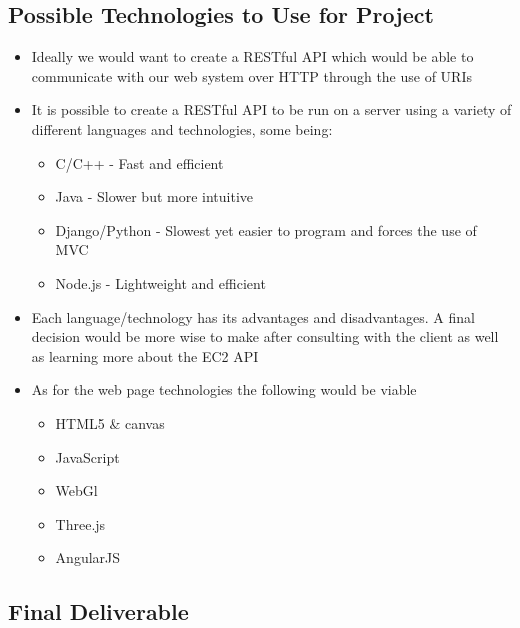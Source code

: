 \documentclass{article}
\begin{document}
	\subsection{Possible Technologies to Use for Project}
		\begin{itemize}
			\item Ideally we would want to create a RESTful API which would be able to communicate with our web system over HTTP through the use of URIs
			\item It is possible to create a RESTful API to be run on a server using a variety of different languages and technologies, some being:
			\begin{itemize}
				\item C/C++ - Fast and efficient
				\item Java - Slower but more intuitive
				\item Django/Python - Slowest yet easier to program and forces the use of MVC
				\item Node.js - Lightweight and efficient
			\end{itemize}
			\item Each language/technology has its advantages and disadvantages. A final decision would be more wise to make after consulting with the client as well as learning more about the EC2 API
			\item As for the web page technologies the following would be viable
			\begin{itemize}
				\item HTML5 \& canvas
				\item JavaScript
				\item WebGl
				\item Three.js
				\item AngularJS
			\end{itemize}
		\end{itemize}
	\subsection{Final Deliverable}
\end{document}
